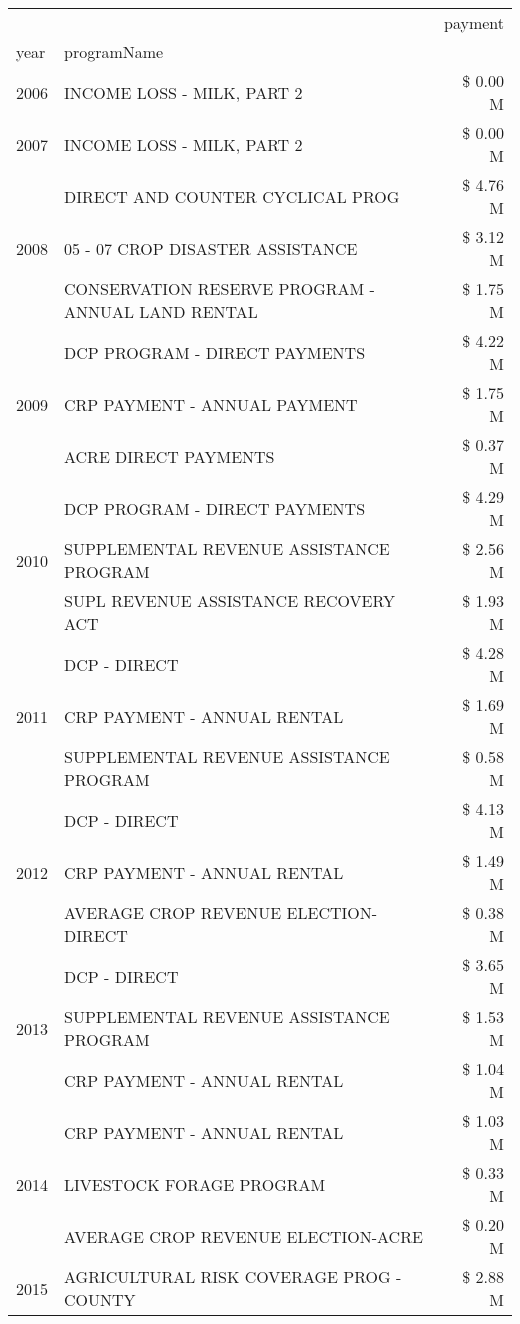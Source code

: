 \begin{tabular}{llr}
\toprule
 &  & payment \\
year & programName &  \\
\midrule
2006 & INCOME LOSS - MILK, PART 2 & \$ 0.00 M \\
\cline{1-3}
2007 & INCOME LOSS - MILK, PART 2 & \$ 0.00 M \\
\cline{1-3}
\multirow[t]{3}{*}{2008} & DIRECT AND COUNTER CYCLICAL PROG & \$ 4.76 M \\
 & 05 - 07 CROP DISASTER ASSISTANCE & \$ 3.12 M \\
 & CONSERVATION RESERVE PROGRAM - ANNUAL LAND RENTAL & \$ 1.75 M \\
\cline{1-3}
\multirow[t]{3}{*}{2009} & DCP PROGRAM - DIRECT PAYMENTS & \$ 4.22 M \\
 & CRP PAYMENT - ANNUAL PAYMENT & \$ 1.75 M \\
 & ACRE DIRECT PAYMENTS & \$ 0.37 M \\
\cline{1-3}
\multirow[t]{3}{*}{2010} & DCP PROGRAM - DIRECT PAYMENTS & \$ 4.29 M \\
 & SUPPLEMENTAL REVENUE ASSISTANCE PROGRAM & \$ 2.56 M \\
 & SUPL REVENUE ASSISTANCE RECOVERY ACT & \$ 1.93 M \\
\cline{1-3}
\multirow[t]{3}{*}{2011} & DCP - DIRECT & \$ 4.28 M \\
 & CRP PAYMENT - ANNUAL RENTAL & \$ 1.69 M \\
 & SUPPLEMENTAL REVENUE ASSISTANCE PROGRAM & \$ 0.58 M \\
\cline{1-3}
\multirow[t]{3}{*}{2012} & DCP - DIRECT & \$ 4.13 M \\
 & CRP PAYMENT - ANNUAL RENTAL & \$ 1.49 M \\
 & AVERAGE CROP REVENUE ELECTION-DIRECT & \$ 0.38 M \\
\cline{1-3}
\multirow[t]{3}{*}{2013} & DCP - DIRECT & \$ 3.65 M \\
 & SUPPLEMENTAL REVENUE ASSISTANCE PROGRAM & \$ 1.53 M \\
 & CRP PAYMENT - ANNUAL RENTAL & \$ 1.04 M \\
\cline{1-3}
\multirow[t]{3}{*}{2014} & CRP PAYMENT - ANNUAL RENTAL & \$ 1.03 M \\
 & LIVESTOCK FORAGE PROGRAM & \$ 0.33 M \\
 & AVERAGE CROP REVENUE ELECTION-ACRE & \$ 0.20 M \\
\cline{1-3}
\multirow[t]{3}{*}{2015} & AGRICULTURAL RISK COVERAGE PROG - COUNTY & \$ 2.88 M \\

\end{tabular}
